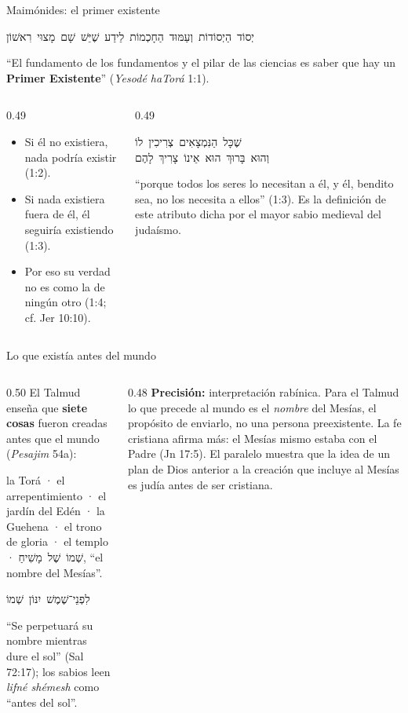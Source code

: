 \documentclass[hyperref={bookmarks=false},aspectratio=169]{beamer}
\newcommand{\heb}[1]{\mbox{\foreignlanguage{hebrew}{#1}}}
\newcommand{\destacar}[1]{\textbf{\textcolor{azul}{#1}}}
\newcommand{\precision}[1]{{\footnotesize\color{gris}\textbf{Precisión:} #1}}
\begin{document}
\begin{frame}{Maimónides: el primer existente}
\begin{center}\heb{יְסוֹד הַיְסוֹדוֹת וְעַמּוּד הַחָכְמוֹת לֵידַע שֶׁיֵּשׁ שָׁם מָצוּי רִאשׁוֹן}\end{center}
\small ``El fundamento de los fundamentos y el pilar de las ciencias es saber que hay un \destacar{Primer Existente}'' (\emph{Yesodé haTorá} 1:1).\par\medskip
\begin{columns}[t,onlytextwidth]
\begin{column}{0.49\textwidth}\scriptsize
\begin{itemize}
\item Si él no existiera, nada podría existir (1:2).
\item Si nada existiera fuera de él, él seguiría existiendo (1:3).
\item Por eso su verdad no es como la de ningún otro (1:4; cf. Jer 10:10).
\end{itemize}
\end{column}
\begin{column}{0.49\textwidth}
\begin{center}\heb{שֶׁכָּל הַנִּמְצָאִים צְרִיכִין לוֹ}\\ \heb{וְהוּא בָּרוּךְ הוּא אֵינוֹ צָרִיךְ לָהֶם}\end{center}
\scriptsize ``porque todos los seres lo necesitan a él, y él, bendito sea, no los necesita a ellos'' (1:3). Es la definición de este atributo dicha por el mayor sabio medieval del judaísmo.
\end{column}
\end{columns}
\end{frame}

\begin{frame}{Lo que existía antes del mundo}
\begin{columns}[t,onlytextwidth]
\begin{column}{0.50\textwidth}\small
El Talmud enseña que \destacar{siete cosas} fueron creadas antes que el mundo (\emph{Pesajim} 54a):\par\smallskip
\scriptsize la Torá · el arrepentimiento · el jardín del Edén · la Guehena · el trono de gloria · el templo · \heb{שְׁמוֹ שֶׁל מָשִׁיחַ}, ``el nombre del Mesías''.\par\medskip
\begin{center}\heb{לִפְנֵי־שֶׁמֶשׁ יִנּוֹן שְׁמוֹ}\end{center}
``Se perpetuará su nombre mientras dure el sol'' (Sal 72:17); los sabios leen \emph{lifné shémesh} como ``antes del sol''.
\end{column}
\begin{column}{0.48\textwidth}
\precision{interpretación rabínica. Para el Talmud lo que precede al mundo es el \emph{nombre} del Mesías, el propósito de enviarlo, no una persona preexistente. La fe cristiana afirma más: el Mesías mismo estaba con el Padre (Jn 17:5). El paralelo muestra que la idea de un plan de Dios anterior a la creación que incluye al Mesías es judía antes de ser cristiana.}
\end{column}
\end{columns}
\end{frame}
\end{document}
